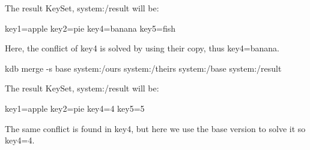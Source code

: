 The result Key\+Set, {\ttfamily system\+:/result} will be\+:


\begin{DoxyCode}
key1=apple
key2=pie
key4=banana
key5=fish
\end{DoxyCode}


Here, the conflict of {\ttfamily key4} is solved by using their copy, thus {\ttfamily key4=banana}.


\begin{DoxyCode}
kdb merge -s base system:/ours system:/theirs system:/base system:/result
\end{DoxyCode}


The result Key\+Set, {\ttfamily system\+:/result} will be\+:


\begin{DoxyCode}
key1=apple
key2=pie
key4=4
key5=5
\end{DoxyCode}


The same conflict is found in {\ttfamily key4}, but here we use the {\ttfamily base} version to solve it so {\ttfamily key4=4}. 